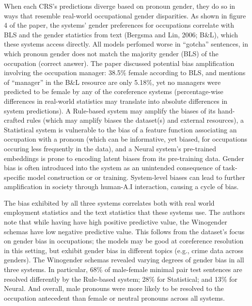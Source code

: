\documentclass[11pt]{article}
\begin{document}
When each CRS's predictions diverge based
on pronoun gender, they do so in ways that resemble real-world 
occupational gender disparities. As shown in figure 4 of the paper, the systems' gender
preferences for occupations correlate with BLS
and the gender statistics from text (Bergsma and Lin, 2006; B\&L), which these systems access directly. 
All models perfomed worse in “gotcha” sentences, in which pronoun gender does not match the 
majority gender (BLS) of the occupation (correct answer).
The paper discussed potential bias amplification involving the occupation manager: 
38.5\% female according to BLS, and mentions of
“manager” in the B\&L resource are only 5.18\%, yet no managers 
were predicted to be female by any of the coreference systems (percentage-wise differences in real-world
statistics may translate into absolute differences
in system predictions).
A Rule-based system may amplify the biases of its hand-crafted rules (which may amplify biases the dataset(s) and external resources),
a Statistical system is vulnerable to the bias of a feature function associating an occupation with a pronoun (which can be informative, yet biased, for
occupations occuring less frequently in the data),
and a Neural system's pre-trained embeddings is prone to encoding latent biases from its pre-training data. 
Gender bias is often introduced into the system as an unintended consequence of task-specific model construction or
or training. System-level biases can lead to further amplification in society through human-A.I interaction, causing a cycle of bias. 

The bias exhibited by all three systems correlates both with real world employment statistics and the text statistics
that these systems use. The authors note that while having have high positive predictive value, the 
Winogender schemas have low negative predictive
value. This follows from the dataset's focus on gender bias in occupations; 
the models may be good at coreference resolution in this setting, but exhibit gender
bias in different topics (e.g., crime data across genders). The Winogender schemas
revealed varying degrees of gender bias in all three
systems. In particular, 68\% of male-female minimal pair 
test sentences are resolved differently by the Rule-based 
system; 28\% for Statistical; and 13\% for Neural. And overall, male pronouns were more likely to
be resolved to the occupation antecedent than female or neutral pronouns across all systems.
\end{document}
